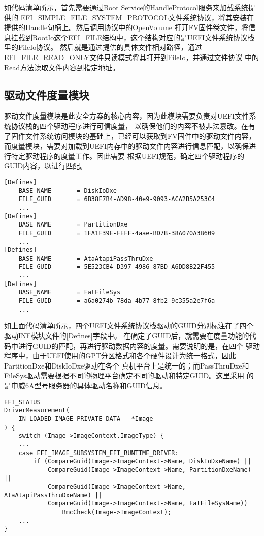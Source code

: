 如代码清单所示，首先需要通过Boot Service的HandleProtocol服务来加载系统提供的
EFI\_SIMPLE\_FILE\_SYSTEM\_PROTOCOL文件系统协议，将其安装在提供的Handle句柄上。然后调用协议中的OpenVolume
打开FV固件卷文件，将信息挂载到RootIo这个EFI\_FILE结构中，这个结构对应的是UEFI文件系统协议栈里的FileIo协议。
然后就是通过提供的具体文件相对路径，通过EFI\_FILE\_READ\_ONLY文件只读模式将其打开到FileIo，并通过文件协议
中的Read方法读取文件内容到指定地址。

\subsection{驱动文件度量模块}
驱动文件度量模块是此安全方案的核心内容，因为此模块需要负责对UEFI文件系统协议栈的四个驱动程序进行可信度量，
以确保他们的内容不被非法篡改。在有了固件文件系统访问模块的基础上，已经可以获取到FV固件中的驱动文件内容，
而度量模块，需要对加载到UEFI内存中的驱动文件内容进行信息匹配，以确保进行特定驱动程序的度量工作。因此需要
根据UEFI规范，确定四个驱动程序的GUID内容，以进行匹配。

\begin{lstlisting}
[Defines]
    BASE_NAME       = DiskIoDxe
    FILE_GUID       = 6B38F7B4-AD98-40e9-9093-ACA2B5A253C4
    ...
[Defines]
    BASE_NAME       = PartitionDxe
    FILE_GUID       = 1FA1F39E-FEFF-4aae-BD7B-38A070A3B609
    ...
[Defines]
    BASE_NAME       = AtaAtapiPassThruDxe
    FILE_GUID       = 5E523CB4-D397-4986-87BD-A6DD8B22F455
    ...
[Defines]
    BASE_NAME       = FatFileSys
    FILE_GUID       = a6a0274b-78da-4b77-8fb2-9c355a2e7f6a
    ...
\end{lstlisting}

如上面代码清单所示，四个UEFI文件系统协议栈驱动的GUID分别标注在了四个驱动INF模块文件的[Defines]字段中。
在确定了GUID后，就需要在度量功能的代码中进行GUID的匹配，再进行驱动数据内容的度量。需要说明的是，在四个
驱动程序中，由于UEFI使用的GPT分区格式和各个硬件设计为统一格式，因此PartitionDxe和DiskIoDxe驱动在各个
真机平台上是统一的；而PassThruDxe和FileSys驱动需要根据不同的物理平台确定不同的驱动和特定GUID。这里采用
的是申威6A型号服务器的具体驱动名称和GUID信息\cite{chinese7}。

\begin{lstlisting}
EFI_STATUS
DriverMeasurement(
    IN LOADED_IMAGE_PRIVATE_DATA   *Image
) {
    switch (Image->ImageContext.ImageType) {
    ...
    case EFI_IMAGE_SUBSYSTEM_EFI_RUNTIME_DRIVER:
        if (CompareGuid(Image->ImageContext->Name, DiskIoDxeName) ||
            CompareGuid(Image->ImageContext->Name, PartitionDxeName) ||
            CompareGuid(Image->ImageContext->Name, AtaAtapiPassThruDxeName) ||
            CompareGuid(Image->ImageContext->Name, FatFileSysName))
                BmcCheck(Image->ImageContext);
    ...
}
\end{lstlisting}

